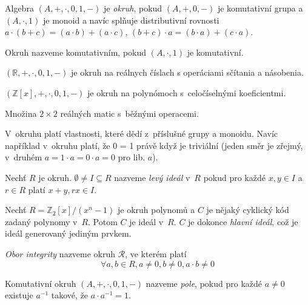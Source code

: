 \begin{definition}[Okruh]
    Algebra $(A, +, \cdot, 0, 1, -)$ je {\em okruh}, pokud
    $(A, +, 0, -)$ je komutativní grupa
    a $(A, \cdot, 1)$ je monoid
    a navíc splňuje distributivní rovnosti
    $a \cdot (b + c) = (a \cdot b) + (a \cdot c)$,
    $(b + c) \cdot a = (b \cdot a) + (c \cdot a)$.

    Okruh nazveme komutativním, pokud $(A, \cdot, 1)$ je komutativní.
\end{definition}

\begin{example}
    $(\mathbb{R}, +, \cdot, 0, 1, -)$ je okruh na reálnych 
	číslach s operáciami sčítania a násobenia.
\end{example}

\begin{example}
	$(\mathbb{Z}[x], +, \cdot, 0, 1, -)$ je okruh na polynómoch
	s~celočíselnými koeficientmi.
\end{example}

\begin{example}
    Množina $2 \times 2$ reálných matic s~běžnými operacemi.
\end{example}

V~okruhu platí vlastnosti, které dědí z~příslušné grupy a monoidu.
Navíc například v~okruhu platí, že 0 = 1 právě když je triviální (jeden
směr je zřejmý, v~druhém $a = 1 \cdot a = 0 \cdot a = 0$ pro lib. $a$).

\begin{definition}
    Nechť $R$ je okruh.
    $\emptyset \neq I \subseteq R$ nazveme {\em levý ideál} v~$R$
    pokud pro každé $x,y \in I$ a $r \in R$ platí
    $x + y, rx \in I$.
\end{definition}

\begin{example}
    Nechť $R = \mathbb{Z}_2[x] / (x^n - 1)$ je okruh polynomů
    a $C$ je nějaký cyklický kód zadaný polynomy v~$R$.
    Potom $C$ je ideál v~$R$.
    $C$ je dokonce {\em hlavní ideál}, což je ideál generovaný jediným prvkem.
\end{example}

\begin{definition}
    {\em Obor integrity} nazveme okruh $\mathcal{R}$, ve kterém platí
    \[
        \forall a,b \in R, a \neq 0, b \neq 0, a \cdot b \neq 0
    \]
\end{definition}


\begin{definition}[Pole]
Komutativní okruh $(A, +, \cdot, 0, 1, -)$ nazveme {\em pole}, pokud
pro každé $a \neq 0$ existuje $a^{-1}$ takové, že $a \cdot a^{-1} = 1$.
\end{definition}

